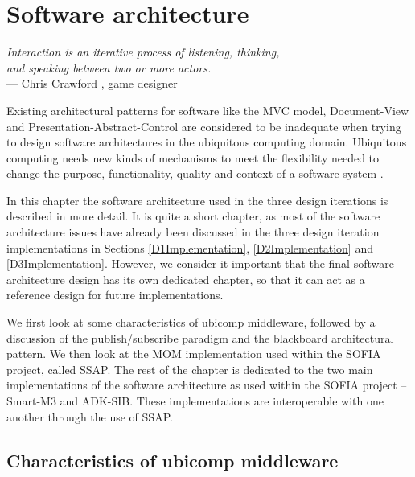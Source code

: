 \chapter{Software architecture}
\label{SoftwareArchitecture}

\begin{flushright}{\slshape    
Interaction is an iterative process of listening, thinking, \\
and speaking between two or more actors.} \\ \medskip
    --- Chris Crawford \cite{Noble2009}, game designer
\end{flushright}


Existing architectural patterns for software like the \ac{MVC} model, Document-View and Presentation-Abstract-Control are considered to be inadequate when trying to design software architectures in the ubiquitous computing domain. Ubiquitous computing needs new kinds of mechanisms to meet the flexibility needed to change the purpose, functionality, quality and context of a software system \cite{Niemela2004}.

In this chapter the software architecture used in the three design iterations is described in more detail. It is quite a short chapter, as most of the software architecture issues have already been discussed in the three design iteration implementations in Sections \ref{D1Implementation}, \ref{D2Implementation} and \ref{D3Implementation}. However, we consider it important that the final software architecture design has its own dedicated chapter, so that it can act as a reference design for future implementations.

We first look at some characteristics of ubicomp middleware, followed by a discussion of the publish/subscribe paradigm and the blackboard architectural pattern. We then look at the \ac{MOM} implementation used with\-in the \ac{SOFIA} project, called \ac{SSAP}. The rest of the chapter is dedicated to the two main implementations of the software architecture as used within the \ac{SOFIA} project -- Smart-M3 and ADK-SIB. These implementations are interoperable with one another through the use of \ac{SSAP}.


\section{Characteristics of ubicomp middleware}

